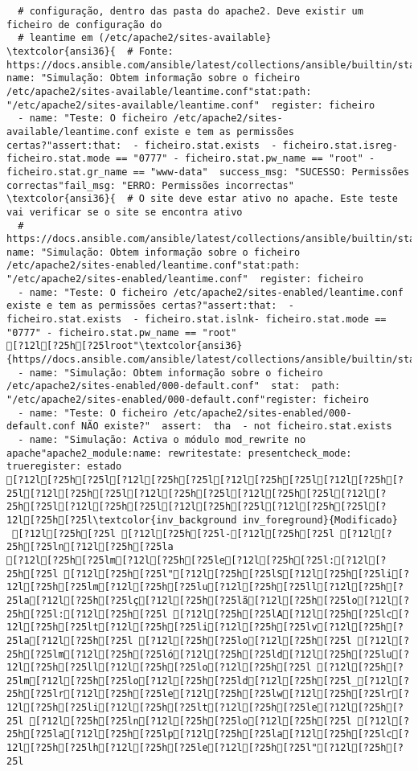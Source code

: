 \documentclass{scrartcl}
\begin{document}
\begin{Verbatim}
  # configuração, dentro das pasta do apache2. Deve existir um ficheiro de configuração do
  # leantime em (/etc/apache2/sites-available}
\textcolor{ansi36}{  # Fonte: https://docs.ansible.com/ansible/latest/collections/ansible/builtin/stat_module.html}- name: "Simulação: Obtem informação sobre o ficheiro /etc/apache2/sites-available/leantime.conf"stat:path: "/etc/apache2/sites-available/leantime.conf"  register: ficheiro
  - name: "Teste: O ficheiro /etc/apache2/sites-available/leantime.conf existe e tem as permissões certas?"assert:that:  - ficheiro.stat.exists  - ficheiro.stat.isreg- ficheiro.stat.mode == "0777" - ficheiro.stat.pw_name == "root" - ficheiro.stat.gr_name == "www-data"  success_msg: "SUCESSO: Permissões correctas"fail_msg: "ERRO: Permissões incorrectas"
\textcolor{ansi36}{  # O site deve estar ativo no apache. Este teste vai verificar se o site se encontra ativo
  # https://docs.ansible.com/ansible/latest/collections/ansible/builtin/stat_module.html}- name: "Simulação: Obtem informação sobre o ficheiro /etc/apache2/sites-enabled/leantime.conf"stat:path: "/etc/apache2/sites-enabled/leantime.conf"  register: ficheiro
  - name: "Teste: O ficheiro /etc/apache2/sites-enabled/leantime.conf existe e tem as permissões certas?"assert:that:  - ficheiro.stat.exists  - ficheiro.stat.islnk- ficheiro.stat.mode == "0777" - ficheiro.stat.pw_name == "root"
[?12l[?25h[?25lroot"\textcolor{ansi36}{https//docs.ansible.com/ansible/latest/collections/ansible/builtin/stat_module.html}
  - name: "Simulação: Obtem informação sobre o ficheiro /etc/apache2/sites-enabled/000-default.conf"  stat:  path: "/etc/apache2/sites-enabled/000-default.conf"register: ficheiro
  - name: "Teste: O ficheiro /etc/apache2/sites-enabled/000-default.conf NÃO existe?"  assert:  tha  - not ficheiro.stat.exists
  - name: "Simulação: Activa o módulo mod_rewrite no apache"apache2_module:name: rewritestate: presentcheck_mode: trueregister: estado
[?12l[?25h[?25l[?12l[?25h[?25l[?12l[?25h[?25l[?12l[?25h[?25l[?12l[?25h[?25l[?12l[?25h[?25l[?12l[?25h[?25l[?12l[?25h[?25l[?12l[?25h[?25l[?12l[?25h[?25l[?12l[?25h[?25l[?12l[?25h[?25l\textcolor{inv_background inv_foreground}{Modificado}
 [?12l[?25h[?25l [?12l[?25h[?25l-[?12l[?25h[?25l [?12l[?25h[?25ln[?12l[?25h[?25la
[?12l[?25h[?25lm[?12l[?25h[?25le[?12l[?25h[?25l:[?12l[?25h[?25l [?12l[?25h[?25l"[?12l[?25h[?25lS[?12l[?25h[?25li[?12l[?25h[?25lm[?12l[?25h[?25lu[?12l[?25h[?25ll[?12l[?25h[?25la[?12l[?25h[?25lç[?12l[?25h[?25lã[?12l[?25h[?25lo[?12l[?25h[?25l:[?12l[?25h[?25l [?12l[?25h[?25lA[?12l[?25h[?25lc[?12l[?25h[?25lt[?12l[?25h[?25li[?12l[?25h[?25lv[?12l[?25h[?25la[?12l[?25h[?25l [?12l[?25h[?25lo[?12l[?25h[?25l [?12l[?25h[?25lm[?12l[?25h[?25ló[?12l[?25h[?25ld[?12l[?25h[?25lu[?12l[?25h[?25ll[?12l[?25h[?25lo[?12l[?25h[?25l [?12l[?25h[?25lm[?12l[?25h[?25lo[?12l[?25h[?25ld[?12l[?25h[?25l_[?12l[?25h[?25lr[?12l[?25h[?25le[?12l[?25h[?25lw[?12l[?25h[?25lr[?12l[?25h[?25li[?12l[?25h[?25lt[?12l[?25h[?25le[?12l[?25h[?25l [?12l[?25h[?25ln[?12l[?25h[?25lo[?12l[?25h[?25l [?12l[?25h[?25la[?12l[?25h[?25lp[?12l[?25h[?25la[?12l[?25h[?25lc[?12l[?25h[?25lh[?12l[?25h[?25le[?12l[?25h[?25l"[?12l[?25h[?25l

\end{Verbatim}
\end{document}
